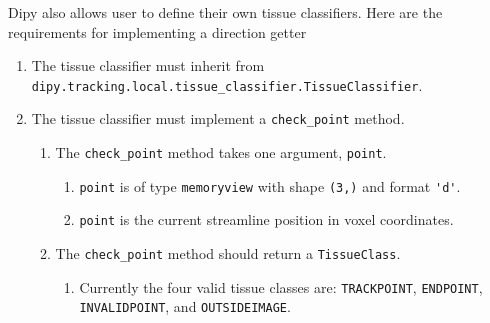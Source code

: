     Dipy also allows user to define their own tissue classifiers. Here are the requirements for implementing a direction getter
\begin{enumerate}
\item The tissue classifier must inherit from \verb|dipy.tracking.local.tissue_classifier.TissueClassifier|.
\item The tissue classifier must implement a \verb|check_point| method.
\begin{enumerate}
\item The \verb|check_point| method takes one argument, \verb|point|.
\begin{enumerate}
\item \verb|point| is of type \verb|memoryview| with shape \verb|(3,)| and format \verb|'d'|.
\item \verb|point| is the current streamline position in voxel coordinates.
\end{enumerate}
\item The \verb|check_point| method should return a \verb|TissueClass|.
\begin{enumerate}
\item Currently the four valid tissue classes are:  \verb|TRACKPOINT|, \verb|ENDPOINT|, \verb|INVALIDPOINT|, and \verb|OUTSIDEIMAGE|.
\end{enumerate}
\end{enumerate}
\end{enumerate}